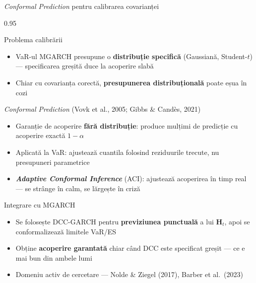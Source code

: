 \documentclass[9pt, aspectratio=169, t]{beamer}
\begin{document}
\begin{frame}{\textit{Conformal Prediction} pentru calibrarea covarianței}
    \begin{cminipage}{0.95\textwidth}
    \vspace{-1mm}
    {\footnotesize
    \begin{block}{Problema calibrării}
        \begin{itemize}\setlength{\itemsep}{0pt}
            \item VaR-ul MGARCH presupune o \textbf{distribuție specifică} (Gaussiană, Student-$t$) --- specificarea greșită duce la acoperire slabă
            \item Chiar cu covarianța corectă, \textbf{presupunerea distribuțională} poate eșua în cozi
        \end{itemize}
    \end{block}
    \begin{block}{\textit{Conformal Prediction} (Vovk et al., 2005; Gibbs \& Cand\`es, 2021)}
        \begin{itemize}\setlength{\itemsep}{0pt}
            \item Garanție de acoperire \textbf{fără distribuție}: produce mulțimi de predicție cu acoperire exactă $1-\alpha$
            \item Aplicată la VaR: ajustează cuantila folosind reziduurile trecute, nu presupuneri parametrice
            \item \textbf{\textit{Adaptive Conformal Inference}} (ACI): ajustează acoperirea în timp real --- se strânge în calm, se lărgește în criză
        \end{itemize}
    \end{block}
    \begin{alertblock}{Integrare cu MGARCH}
        \begin{itemize}\setlength{\itemsep}{0pt}
            \item Se folosește DCC-GARCH pentru \textbf{previziunea punctuală} a lui $\mathbf{H}_t$, apoi se conformalizează limitele VaR/ES
            \item Obține \textbf{acoperire garantată} chiar când DCC este specificat greșit --- ce e mai bun din ambele lumi
            \item Domeniu activ de cercetare --- Nolde \& Ziegel (2017), Barber et al.\ (2023)
        \end{itemize}
    \end{alertblock}
    }
    \end{cminipage}
\end{frame}
\end{document}

